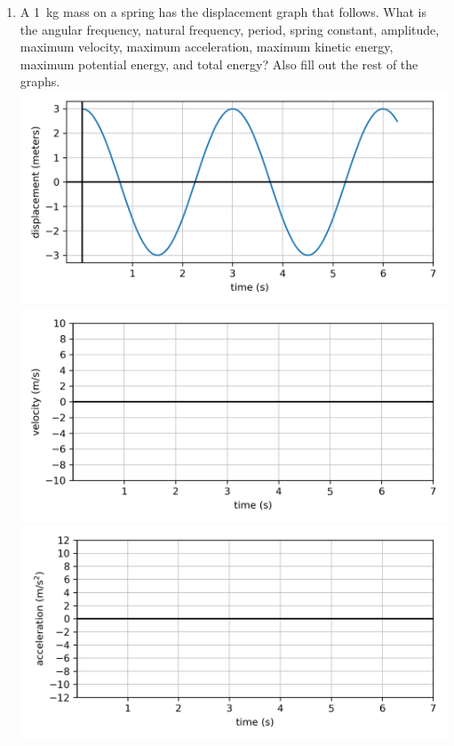 \begin{enumerate}
\item
A \SI{1}{kg} mass on a spring has the displacement graph that follows. What is the angular frequency, natural frequency, period, spring constant, amplitude, maximum velocity, maximum acceleration, maximum kinetic energy, maximum potential energy, and total energy? Also fill out the rest of the graphs.\\
\includegraphics[scale=1]{week11-dispvst.png}\\
\includegraphics[scale=1]{week11-velvst.png}\\
\includegraphics[scale=1]{week11-accvst.png}\\

\end{enumerate}

